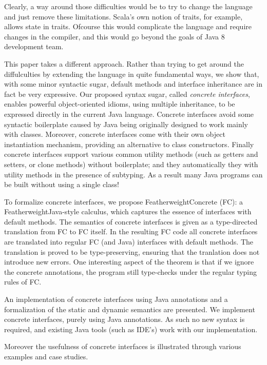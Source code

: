 \noindent Clearly, a way around those difficulties would be to try 
to change the language and just remove these limitations. Scala's 
own notion of traits, for example, allows state in traits. Ofcourse 
this would complicate the language and require changes in the compiler, 
and this would go beyond the goals of Java 8 development team. 

This paper takes a different approach. Rather than trying to get
around the diffulculties by extending the language in quite
fundamental ways, we show that, with some minor syntactic sugar,
default methods and interface inheritance are in fact be very
expressive. Our proposed syntax sugar, called \emph{concrete
  interfaces}, enables powerful object-oriented idioms, using multiple
inheritance, to be expressed directly in the current Java
language. Concrete interfaces avoid some syntactic boilerplate caused
by Java being originally designed to work mainly with
classes. Moreover, concrete interfaces come with their own object
instantiation mechanism, providing an alternative to class
constructors. Finally concrete interfaces support various common
utility methods (such as getters and setters, or clone methods)
without boilerplate; and they automatically they with utility methods
in the presence of subtyping. As a result many Java programs can be 
built without using a single class! 

To formalize concrete interfaces, we propose FeatherweightConcrete (FC): 
a FeatherweightJava-style calculus, which captures the essence 
of interfaces with default methods. The semantics of concrete interfaces 
is given as a type-directed translation from FC to FC itself. 
In the resulting FC code all concrete interfaces are translated into 
regular FC (and Java) interfaces with default methods. The translation 
is proved to be type-preserving, ensuring that the tranlation does 
not introduce new errors. One interesting aspect of the theorem is that 
if we ignore the concrete annotations, the program still type-checks 
under the regular typing rules of FC.

An implementation of concrete interfaces using Java annotations and a
formalization of the static and dynamic semantics are presented. We
implement concrete interfaces, purely using Java annotations. As such
no new syntax is required, and existing Java tools (such as IDE's)
work with our implementation.

Moreover the usefulness of concrete
interfaces is illustrated through various examples and case studies.

